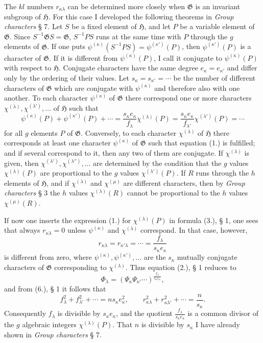 \documentclass[11pt]{article}
\newcommand{\Hgr}{\mathfrak{H}}
\newcommand{\Ggr}{\mathfrak{G}}
\begin{document}
The $kl$ numbers $r_{\kappa\lambda}$ can be determined more closely when $\Ggr$ is an invariant subgroup of $\Hgr$. For this case I developed the following theorems in \emph{Group characters} § 7. Let $S$ be a fixed element of $\Hgr$, and let $P$ be a variable element of $\Ggr$. Since $S^{-1}\Ggr S=\Ggr$, $S^{-1}PS$ runs at the same time with $P$ through the $g$ elements of $\Ggr$. If one puts $\psi^{(\kappa)}(S^{-1}PS)=\psi^{(\kappa')}(P)$, then $\psi^{(\kappa')}(P)$ is a character of $\Ggr$. If it is different from $\psi^{(\kappa)}(P)$, I call it conjugate to $\psi^{(\kappa)}(P)$ with respect to $\Hgr$. Conjugate characters have the same degree $e_\kappa=e_{\kappa'}$ and differ only by the ordering of their values. Let $s_\kappa=s_{\kappa'}=\cdots$ be the number of different characters of $\Ggr$ which are conjugate with $\psi^{(\kappa)}$ and therefore also with one another. To each character $\psi^{(\kappa)}$ of $\Ggr$ there correspond one or more characters $\chi^{(\lambda)},\chi^{(\lambda')},\ldots$ of $\Hgr$ such that
\[
\tag{1.}
  \psi^{(\kappa)}(P)+\psi^{(\kappa')}(P)+\cdots
  =
  \frac{s_\kappa e_\kappa}{f_\lambda}\chi^{(\lambda)}(P)
  =
  \frac{s_\kappa e_\kappa}{f_{\lambda'}}\chi^{(\lambda')}(P)
  =\cdots
\]
for all $g$ elements $P$ of $\Ggr$. Conversely, to each character $\chi^{(\lambda)}$ of $\Hgr$ there corresponds at least one character $\psi^{(\kappa)}$ of $\Ggr$ such that equation (1.) is fulfilled; and if several correspond to it, then any two of them are conjugate. If $\chi^{(\lambda)}$ is given, then $\chi^{(\lambda')},\chi^{(\lambda'')},\ldots$ are determined by the condition that the $g$ values $\chi^{(\lambda)}(P)$ are proportional to the $g$ values $\chi^{(\lambda')}(P)$. If $R$ runs through the $h$ elements of $\Hgr$, and if $\chi^{(\lambda)}$ and $\chi^{(\mu)}$ are different characters, then by \emph{Group characters} § 3 the $h$ values $\chi^{(\lambda)}(R)$ cannot be proportional to the $h$ values $\chi^{(\mu)}(R)$.

If now one inserts the expression (1.) for $\chi^{(\lambda)}(P)$ in formula (3.), § 1, one sees that always $r_{\kappa\lambda}=0$ unless $\psi^{(\kappa)}$ and $\chi^{(\lambda)}$ correspond. In that case, however,
\[
\tag{2.}
  r_{\kappa\lambda}=r_{\kappa'\lambda}=\cdots=\frac{f_\lambda}{s_\kappa e_\kappa}
\]
is different from zero, where $\psi^{(\kappa)},\psi^{(\kappa')},\ldots$ are the $s_\kappa$ mutually conjugate characters of $\Ggr$ corresponding to $\chi^{(\lambda)}$. Thus equation (2.), § 1 reduces to
\[
\tag{3.}
  \Phi_\lambda=(\Psi_\kappa\Psi_{\kappa'}\cdots)^{\frac{f_\lambda}{s_\kappa e_\kappa}},
\]
and from (6.), § 1 it follows that
\[
\tag{4.}
  f_\lambda^2+f_{\lambda'}^2+\cdots=ns_\kappa e_\kappa^2,
  \qquad
  r_{\kappa\lambda}^2+r_{\kappa\lambda'}^2+\cdots=\frac{n}{s_\kappa}.
\]
Consequently $f_\lambda$ is divisible by $s_\kappa e_\kappa$, and the quotient $\frac{f_\lambda}{s_\kappa e_\kappa}$ is a common divisor of the $g$ algebraic integers $\chi^{(\lambda)}(P)$. That $n$ is divisible by $s_\kappa$ I have already shown in \emph{Group characters} § 7.
\end{document}
